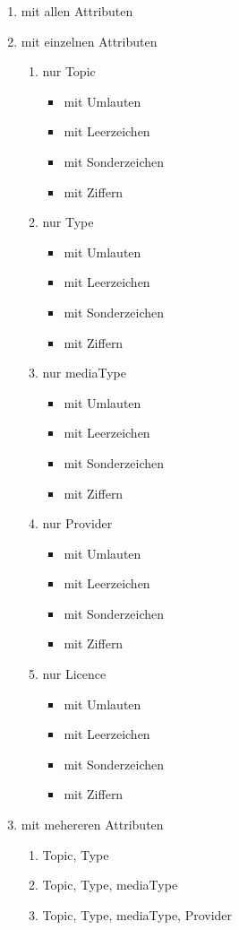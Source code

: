\begin{enumerate}
  \item mit allen Attributen
  \item mit einzelnen Attributen

   \begin{enumerate}
    \item nur Topic  
    \begin{itemize}
    \item mit Umlauten
    \item mit Leerzeichen
    \item mit Sonderzeichen
    \item mit Ziffern
\end{itemize}
	\item nur Type
 	\begin{itemize}
    \item mit Umlauten
    \item mit Leerzeichen
    \item mit Sonderzeichen
    \item mit Ziffern
\end{itemize}
	\item nur mediaType
	\begin{itemize}
    \item mit Umlauten
    \item mit Leerzeichen
    \item mit Sonderzeichen
    \item mit Ziffern
    \end{itemize}
    \item nur Provider
	\begin{itemize}
    \item mit Umlauten
    \item mit Leerzeichen
    \item mit Sonderzeichen
    \item mit Ziffern
    \end{itemize}
    \item nur Licence
	\begin{itemize}
    \item mit Umlauten
    \item mit Leerzeichen
    \item mit Sonderzeichen
    \item mit Ziffern
    \end{itemize}
\end{enumerate}
\item mit mehereren Attributen
\begin{enumerate}
    \item Topic, Type
	\item Topic, Type, mediaType
	\item Topic, Type, mediaType, Provider
    \end{enumerate}
\end{enumerate}

